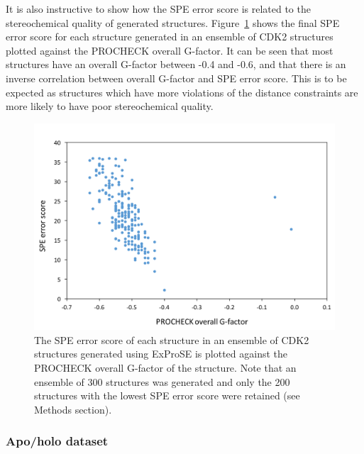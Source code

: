 It is also instructive to show how the SPE error score is related to the stereochemical quality of generated structures.
Figure~\ref{fig:score_procheck} shows the final SPE error score for each structure generated in an ensemble of CDK2 structures plotted against the PROCHECK overall G-factor.
It can be seen that most structures have an overall G-factor between -0.4 and -0.6, and that there is an inverse correlation between overall G-factor and SPE error score.
This is to be expected as structures which have more violations of the distance constraints are more likely to have poor stereochemical quality.


\begin{figure}
\centering

\includegraphics[width=\textwidth]{figures/score_procheck/score_procheck}

\caption[SPE error score plotted against PROCHECK overall G-factor for an ExProSE ensemble]
{The SPE error score of each structure in an ensemble of CDK2 structures generated using ExProSE is plotted against the PROCHECK overall G-factor of the structure.
Note that an ensemble of 300 structures was generated and only the 200 structures with the lowest SPE error score were retained (see Methods section).}

\label{fig:score_procheck}
\end{figure}


\subsubsection{Apo/holo dataset}

